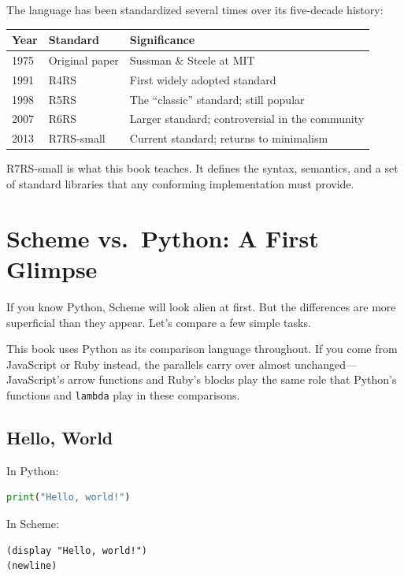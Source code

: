 The language has been standardized several times over its five-decade history:

\begin{center}
\begin{tabular}{lll}
\textbf{Year} & \textbf{Standard} & \textbf{Significance} \\
\hline
1975 & Original paper & Sussman \& Steele at MIT \\
1991 & R4RS & First widely adopted standard \\
1998 & R5RS & The ``classic'' standard; still popular \\
2007 & R6RS & Larger standard; controversial in the community \\
2013 & R7RS-small\index{R7RS} & Current standard; returns to minimalism \\
\end{tabular}
\end{center}

R7RS-small is what this book teaches. It defines the syntax, semantics, and a set of standard libraries that any conforming implementation must provide.

\section{Scheme vs.\ Python: A First Glimpse}

If you know Python, Scheme will look alien at first. But the differences are more superficial than they appear. Let's compare a few simple tasks.

This book uses Python as its comparison language throughout. If you come from JavaScript or Ruby instead, the parallels carry over almost unchanged---JavaScript's arrow functions and Ruby's blocks play the same role that Python's functions and \texttt{lambda} play in these comparisons.

\subsection{Hello, World}

In Python:

\begin{lstlisting}[language=Python, style=scheme, keywordstyle=\bfseries]
print("Hello, world!")
\end{lstlisting}

In Scheme:

\begin{lstlisting}
(display "Hello, world!")
(newline)
\end{lstlisting}

